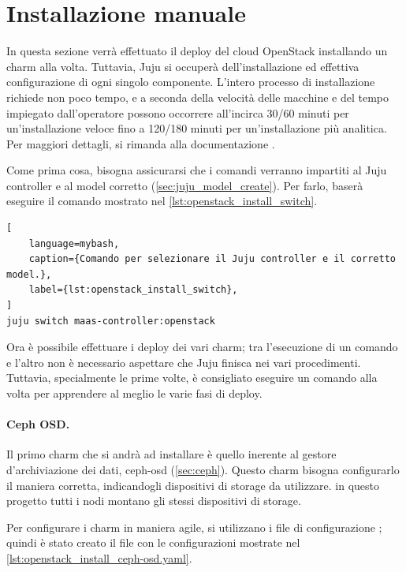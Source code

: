 \section{Installazione manuale}\label{sec:openstack_manual_installation}
In questa sezione verrà effettuato il deploy del cloud OpenStack installando un charm alla volta.
% 
Tuttavia, Juju si occuperà dell'installazione ed effettiva configurazione di ogni singolo componente.
% 
L'intero processo di installazione richiede non poco tempo, e a seconda della velocità delle macchine e del tempo impiegato dall'operatore possono occorrere all'incirca 30/60 minuti per un'installazione veloce fino a 120/180 minuti per un'installazione più analitica.
% 
Per maggiori dettagli, si rimanda alla documentazione \cite{openstack_installation_juju}.

Come prima cosa, bisogna assicurarsi che i comandi verranno impartiti al Juju controller e al model corretto (\cref{sec:juju_model_create}).
% 
Per farlo, baserà eseguire il comando mostrato nel \cref{lst:openstack_install_switch}.

\begin{lstlisting}[
    language=mybash, 
    caption={Comando per selezionare il Juju controller e il corretto model.}, 
    label={lst:openstack_install_switch},
]
juju switch maas-controller:openstack
\end{lstlisting}

\bigskip\noindent
Ora è possibile effettuare i deploy dei vari charm;
% 
tra l'esecuzione di un comando e l'altro non è necessario aspettare che Juju finisca nei vari procedimenti.
% 
Tuttavia, specialmente le prime volte, è consigliato eseguire un comando alla volta per apprendere al meglio le varie fasi di deploy.



 \bigskip\noindent
\paragraph{Ceph OSD.}
Il primo charm che si andrà ad installare è quello inerente al gestore d'archiviazione dei dati, ceph-osd (\cref{sec:ceph}).
% 
Questo charm bisogna configurarlo il maniera corretta, indicandogli dispositivi di storage da utilizzare.
% 
in questo progetto tutti i nodi montano gli stessi dispositivi di storage.

Per configurare i charm in maniera agile, si utilizzano i file di configurazione ;
% 
quindi è stato creato il file  con le configurazioni mostrate nel \cref{lst:openstack_install_ceph-osd.yaml}.

